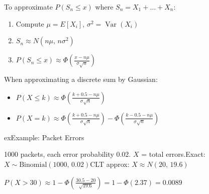 

To approximate $P(S_{n} \le x)$ where $S_{n} = X_{1} + \ldots + X_{n}$:

\begin{enumerate}
\def\labelenumi{\arabic{enumi}.}
\tightlist
\item
  Compute $\mu = E[X_{i}],\, \sigma^{2} = \operatorname{Var}(X_{i})$
\item
  $S_{n} \approx N(n\mu,\, n\sigma^{2})$
\item
  $\displaystyle P(S_{n} \le x) \approx \Phi \left(\frac{x - n\mu}{\sigma \sqrt{n}}\right)$
\end{enumerate}


When approximating a discrete sum by Gaussian:

\begin{itemize}
\tightlist
\item
  $\displaystyle P(X \le k) \approx \Phi \left(\frac{k + 0.5 - n\mu}{\sigma \sqrt{n}}\right)$
\item
  $\displaystyle P(X = k) \approx \Phi \left(\frac{k + 0.5 - n\mu}{\sigma \sqrt{n}}\right) - \Phi \left(\frac{k - 0.5 - n\mu}{\sigma \sqrt{n}}\right)$
\end{itemize}

\begin{PSbox}[unbreakable]{ex}{Example: Packet Errors}

1000 packets, each error probability 0.02. $X$ = total errors.\PSbr{}Exact: $X \sim \mathrm{Binomial}(1000,\, 0.02)$\PSbr{}CLT approx: $X \approx N(20,\, 19.6)$

$\displaystyle P(X > 30) \approx 1 - \Phi \left(\frac{30.5 - 20}{\sqrt{19.6}}\right) = 1 - \Phi (2.37) = 0.0089$

\end{PSbox}


